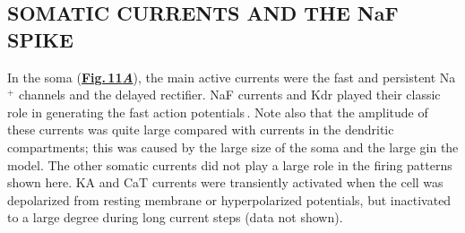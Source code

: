 \documentclass[12pt]{article}
\begin{document}
\subsection*{SOMATIC CURRENTS AND THE NaF SPIKE}

In the soma (\href{../pub-purkinje-deschutter1-fig-11/pub-purkinje-deschutter1-fig-11.tex}{\bf Fig.\,11{\it A}}), the main active currents were the fast and persistent
Na$^+$ channels and the delayed rectifier. NaF currents and
Kdr played their classic role in generating the fast action
potentials\,\cite{hodgkin52:_quantitative_description}. Note also that the
amplitude of these currents was quite large compared with
currents in the dendritic compartments; this was caused by
the large size of the soma and the large gin the model. The
other somatic currents did not play a large role in the firing
patterns shown here. KA and CaT currents were transiently
activated when the cell was depolarized from resting membrane
or hyperpolarized potentials, but inactivated to a
large degree during long current steps (data not shown).



\end{document}
